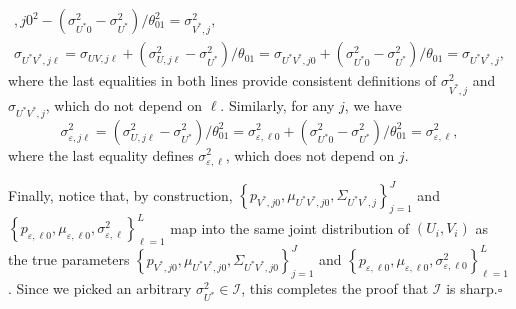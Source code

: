 \documentclass[12pt]{article}
\begin{document}
\begin{appendices}
\begin{gather*}
{{},j0}^{2}-(\sigma _{U^{\ast }0}^{2}-\sigma _{U^{\ast }}^{2})/\theta
_{01}^{2}=\sigma _{V^{\ast },j}^{2}, \\
\sigma _{U^{\ast }V^{\ast },j\ell }=\sigma _{UV,j\ell }+(\sigma _{U,j\ell
}^{2}-\sigma _{U^{\ast }}^{2})/\theta _{01}=\sigma _{U^{\ast }V^{\ast
},j0}+(\sigma _{U^{\ast }0}^{2}-\sigma _{U^{\ast }}^{2})/\theta _{01}=\sigma
_{U^{\ast }V^{\ast },j},
\end{gather*}%
where the last equalities in both lines provide consistent definitions of $%
\sigma _{V^{\ast },j}^{2}$ and $\sigma _{U^{\ast }V^{\ast },j}$, which do
not depend on $\ell $. 
Similarly, for any $j$, we have 
\begin{equation*}
\sigma _{\varepsilon ,j\ell }^{2}=(\sigma _{U,j\ell }^{2}-\sigma _{U^{\ast
}}^{2})/\theta _{01}^{2}=\sigma _{\varepsilon ,\ell 0}^{2}+(\sigma _{U^{\ast
}0}^{2}-\sigma _{U^{\ast }}^{2})/\theta _{01}^{2}=\sigma _{\varepsilon ,\ell
}^{2},
\end{equation*}%
where the last equality defines $\sigma _{\varepsilon ,\ell }^{2}$, which
does not depend on $j$.

Finally, notice that, by construction, $\left\{ p_{V^{\ast },j0},\mu
_{U^{\ast }V^{\ast },j0},\Sigma _{U^{\ast }V^{\ast },j}\right\} _{j=1}^{J}$
and $\left\{ p_{\varepsilon ,\ell 0},\mu _{\varepsilon ,\ell 0},\sigma
_{\varepsilon ,\ell }^{2}\right\} _{\ell =1}^{L}$ map into the same joint
distribution of $(U_{i},V_{i})$ as the true parameters $\left\{ p_{V^{\ast
},j0},\mu _{U^{\ast }V^{\ast },j0},\Sigma _{U^{\ast }V^{\ast },j0}\right\}
_{j=1}^{J}$ and $\left\{ p_{\varepsilon ,\ell 0},\mu _{\varepsilon ,\ell
0},\sigma _{\varepsilon ,\ell 0}^{2}\right\} _{\ell =1}^{L}$. Since we
picked an arbitrary $\sigma _{U^{\ast }}^{2}\in \mathcal{I}$, this completes
the proof that $\mathcal{I}$ is sharp.\hfill $\square $

\end{appendices}%
\end{document}
